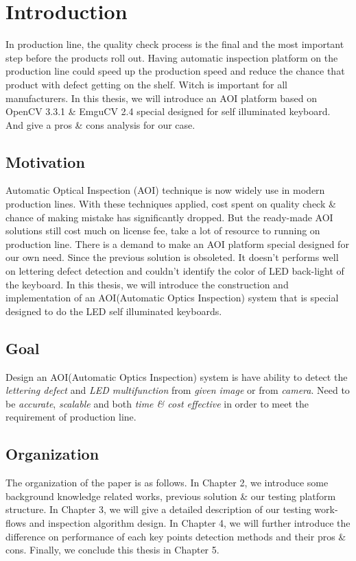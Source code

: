 \chapter{Introduction}
\label{c:intro}
In production line, the quality check process is the final and the most important step before the
products roll out.  
Having automatic inspection platform on the production line could speed up the production speed and reduce the chance that product with defect getting on the shelf. 
Witch is important for all manufacturers.
In this thesis, we will introduce an AOI platform based on OpenCV 3.3.1 \& EmguCV 2.4 special designed for self illuminated keyboard.
And give a pros \& cons analysis for our case.


\section{Motivation} \label{section:motivation} 
Automatic Optical Inspection (AOI) technique is now widely use in modern production lines.
With these techniques applied, cost spent on quality check \& chance of making mistake has significantly dropped.
But the ready-made AOI solutions still cost much on license fee, take a lot of resource to running on production line.
There is a demand to make an AOI platform special designed for our own need.
Since the previous solution is obsoleted. It doesn't performs well on
lettering defect detection and couldn't identify the color of LED back-light
of the keyboard. In this thesis, we will introduce the construction and
implementation of an AOI(Automatic Optics Inspection) system that is special
designed to do the LED self illuminated keyboards.


\section{Goal}
\label{section:goal}
Design an AOI(Automatic Optics Inspection) system is have ability to detect the \emph{lettering defect} and \emph{LED multifunction} from \emph{given image} or from \emph{camera}.
Need to be \emph{accurate}, \emph{scalable} and both \emph{time \& cost effective} in order to meet the requirement of production line.

\section{Organization}
\label{section:organization}
The organization of the paper is as follows. 
In Chapter 2, we introduce some background knowledge related works, previous solution \& our testing platform structure.
In Chapter 3, we will give a detailed description of our testing work-flows and inspection algorithm design.
In Chapter 4, we will further introduce the difference on performance of each key points detection methods and their pros \& cons.
Finally, we conclude this thesis in Chapter 5.


